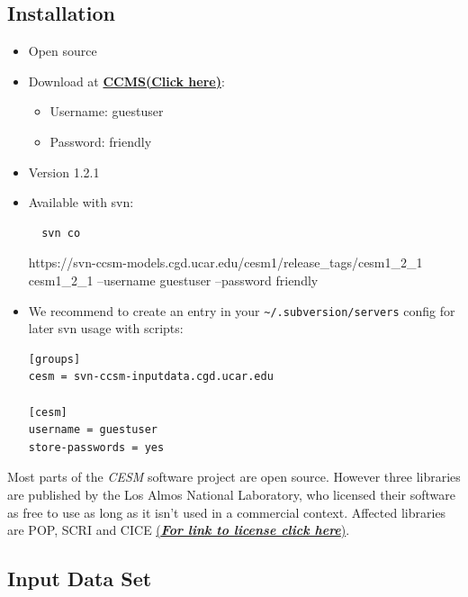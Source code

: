 \documentclass[]{article}
\providecommand{\tightlist}{%
  \setlength{\itemsep}{0pt}\setlength{\parskip}{0pt}}
\begin{document}
\subsection{Installation}\label{installation-1}

\begin{itemize}
\item
  Open source
\item
  Download at
  \href{http://www.cesm.ucar.edu/models/cesm1.2/cesm/doc/usersguide/x290.html\#download_ccsm_code}{\textbf{\textbf{CCMS(Click
  here)}}}:

  \begin{itemize}
  \tightlist
  \item
    Username: guestuser
  \item
    Password: friendly
  \end{itemize}
\item
  Version 1.2.1
\item
  Available with svn:

\begin{verbatim}
  svn co 
\end{verbatim}

  https://svn-ccsm-models.cgd.ucar.edu/cesm1/release\_tags/cesm1\_2\_1\\
  cesm1\_2\_1 --username guestuser --password friendly
\item
  We recommend to create an entry in your
  \texttt{\textasciitilde{}/.subversion/servers} config for later svn
  usage with scripts:

\begin{verbatim}
[groups]
cesm = svn-ccsm-inputdata.cgd.ucar.edu

[cesm]
username = guestuser
store-passwords = yes
\end{verbatim}
\end{itemize}

Most parts of the \emph{CESM} software project are open source. However
three libraries are published by the Los Almos National Laboratory, who
licensed their software as free to use as long as it isn't used in a
commercial context. Affected libraries are POP, SCRI and CICE
\href{http://www.cesm.ucar.edu/management/UofCAcopyright.ccsm3.html}{(\textbf{\textbf{\emph{For
link to license click here}}})}.

\subsection{Input Data Set}\label{input-data-set}
\end{document}
